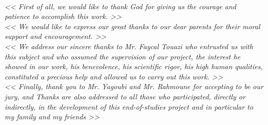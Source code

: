 \vspace*{0.5in}

\thispagestyle{empty}

\begin{center}
    \textit{\fontsize{34}{46}{\bfseries{\color{Black}{Acknowledgment}}}}
    \vspace{0.7in}
    \textit{
    \\\large{<< First of all, we would like to thank God for giving us the courage and patience to accomplish this work. >>}
    \vspace{0.4in}
    \\\large{<< We would like to express our great thanks to our dear parents for their moral support and encouragement. >>}
    \vspace{0.4in}
    \\\large{<< We address our sincere thanks to Mr. Faycal Touazi who entrusted us with this subject and who assumed the supervision of our project, the interest he showed in our work, his benevolence, his scientific rigor, his high human qualities, constituted a precious help and allowed us to carry out this work. >>}
    \vspace{0.4in}
    \\\large{<< Finally, thank you to Mr. Yagoubi and Mr. Rahmoune for accepting to be our jury, and Thanks are also addressed to all those who participated, directly or indirectly, in the development of this end-of-studies project and in particular to my family and my friends >>}
    \\}
\end{center}

